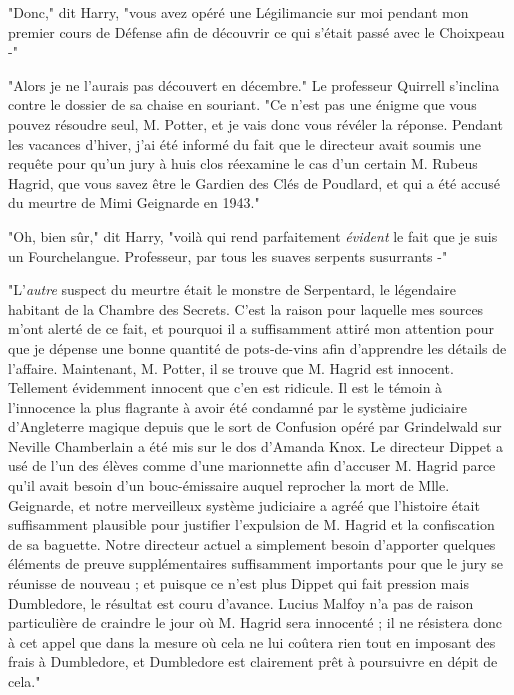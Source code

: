 "Donc," dit Harry, "vous avez opéré une Légilimancie sur moi pendant mon premier cours de Défense afin de découvrir ce qui s'était passé avec le Choixpeau -"

"Alors je ne l'aurais pas découvert en décembre." Le professeur Quirrell s'inclina contre le dossier de sa chaise en souriant. "Ce n'est pas une énigme que vous pouvez résoudre seul, M. Potter, et je vais donc vous révéler la réponse. Pendant les vacances d'hiver, j'ai été informé du fait que le directeur avait soumis une requête pour qu'un jury à huis clos réexamine le cas d'un certain M. Rubeus Hagrid, que vous savez être le Gardien des Clés de Poudlard, et qui a été accusé du meurtre de Mimi Geignarde en 1943."

"Oh, bien sûr," dit Harry, "voilà qui rend parfaitement \emph{évident}  le fait que je suis un Fourchelangue. Professeur, par tous les suaves serpents susurrants -"

"L'\emph{autre}  suspect du meurtre était le monstre de Serpentard, le légendaire habitant de la Chambre des Secrets. C'est la raison pour laquelle mes sources m'ont alerté de ce fait, et pourquoi il a suffisamment attiré mon attention pour que je dépense une bonne quantité de pots-de-vins afin d'apprendre les détails de l'affaire. Maintenant, M. Potter, il se trouve que M. Hagrid est innocent. Tellement évidemment innocent que c'en est ridicule. Il est le témoin à l'innocence la plus flagrante à avoir été condamné par le système judiciaire d'Angleterre magique depuis que le sort de Confusion opéré par Grindelwald sur Neville Chamberlain a été mis sur le dos d'Amanda Knox. Le directeur Dippet a usé de l'un des élèves comme d'une marionnette afin d'accuser M. Hagrid parce qu'il avait besoin d'un bouc-émissaire auquel reprocher la mort de Mlle. Geignarde, et notre merveilleux système judiciaire a agréé que l'histoire était suffisamment plausible pour justifier l'expulsion de M. Hagrid et la confiscation de sa baguette. Notre directeur actuel a simplement besoin d'apporter quelques éléments de preuve supplémentaires suffisamment importants pour que le jury se réunisse de nouveau ; et puisque ce n'est plus Dippet qui fait pression mais Dumbledore, le résultat est couru d'avance. Lucius Malfoy n'a pas de raison particulière de craindre le jour où M. Hagrid sera innocenté ; il ne résistera donc à cet appel que dans la mesure où cela ne lui coûtera rien tout en imposant des frais à Dumbledore, et Dumbledore est clairement prêt à poursuivre en dépit de cela."

